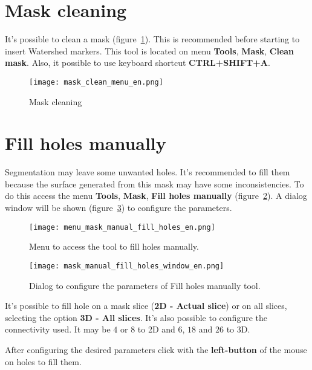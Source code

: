 \section{Mask cleaning}
\label{cap:limpeza_mascara}

It's possible to clean a mask (figure~\ref{fig:limpeza_mascara}). This is recommended before starting to insert Watershed markers. This tool is located on menu \textbf{Tools}, \textbf{Mask}, \textbf{Clean mask}. Also, it possible to use keyboard shortcut \textbf{CTRL+SHIFT+A}.

\begin{figure}[!htb]
\centering
\texttt{[image: mask\_clean\_menu\_en.png]}
\caption{Mask cleaning}
\label{fig:limpeza_mascara}
\end{figure}

\section{Fill holes manually}

Segmentation may leave some unwanted holes. It's recommended to fill them because the surface generated from this mask may have some inconsistencies. To do this access the menu \textbf{Tools}, \textbf{Mask}, \textbf{Fill holes manually} (figure~\ref{fig:menu_mask_manual_fill_holes}). A dialog window will be shown (figure~\ref{fig:mask_manual_fill_holes_window}) to configure the parameters.

\begin{figure}[!htb]
\centering
\texttt{[image: menu\_mask\_manual\_fill\_holes\_en.png]}
\caption{Menu to access the tool to fill holes manually.}
\label{fig:menu_mask_manual_fill_holes}
\end{figure}

\begin{figure}[!htb]
\centering
\texttt{[image: mask\_manual\_fill\_holes\_window\_en.png]}
\caption{Dialog to configure the parameters of Fill holes manually tool.}
\label{fig:mask_manual_fill_holes_window}
\end{figure}

It's possible to fill hole on a mask slice (\textbf{2D - Actual slice}) or on all slices, selecting the option \textbf{3D - All slices}. It's also possible to configure the connectivity used. It may be $4$ or $8$ to 2D and $6$, $18$ and $26$ to 3D.

After configuring the desired parameters click with the \textbf{left-button} of the mouse on holes to fill them.

